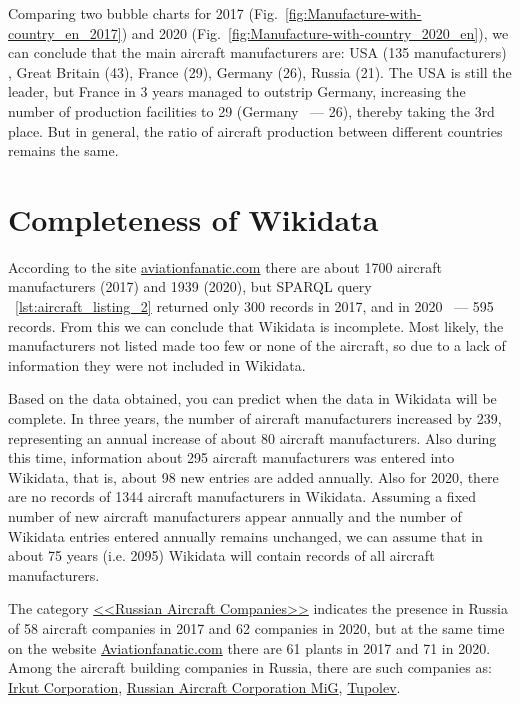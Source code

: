 Comparing two bubble charts for 2017 (Fig.~\ref{fig:Manufacture-with-country_en_2017}) and 2020 (Fig.~\ref{fig:Manufacture-with-country_2020_en}), 
we can conclude that the main aircraft manufacturers are: USA (135 manufacturers) , Great Britain (43), France (29), Germany (26), Russia (21). 
The USA is still the leader, but France in 3 years managed to outstrip Germany, increasing the number of production facilities to 29 
(Germany ~--- 26), thereby taking the 3rd place. But in general, the ratio of aircraft production between different countries remains the same.


\section{Completeness of Wikidata}

According to the site \href{https://www.aviationfanatic.com/}{aviationfanatic.com} there are about \num{1700} aircraft manufacturers (2017) 
and \num{1939} (2020), but SPARQL query ~\ref{lst:aircraft_listing_2} returned only 300 records in 2017, and in 2020 ~--- 595 records. 
From this we can conclude that Wikidata is incomplete. Most likely, the manufacturers not listed made too few or none of the aircraft, 
so due to a lack of information they were not included in Wikidata.

Based on the data obtained, you can predict when the data in Wikidata will be complete. In three years, the number of aircraft manufacturers 
increased by 239, representing an annual increase of about 80 aircraft manufacturers. Also during this time, information about 295 aircraft 
manufacturers was entered into Wikidata, that is, about 98 new entries are added annually. Also for 2020, there are no records of \num{1344} 
aircraft manufacturers in Wikidata. Assuming a fixed number of new aircraft manufacturers appear annually and the number of Wikidata entries 
entered annually remains unchanged, we can assume that in about 75 years (i.e. 2095) Wikidata will contain records of all aircraft manufacturers.

The category \href{https://cutt.ly/NhrKnWn}{<<Russian Aircraft Companies>>} indicates the presence in Russia of 58 aircraft companies in 2017 and 
62 companies in 2020, but at the same time on the website \href{https://www.aviationfanatic.com/}{Aviationfanatic.com} there are 61 
plants in 2017 and 71 in 2020. Among the aircraft building companies in Russia, there are such companies as: \href{https://en.wikipedia.org/wiki/Irkut_Corporation}{Irkut Corporation}, 
\href{https://en.wikipedia.org/wiki/Russian_Aircraft_Corporation_MiG}{Russian Aircraft Corporation MiG}, 
\href{https://en.wikipedia.org/wiki/Tupolev}{Tupolev}.

